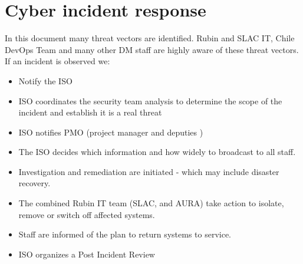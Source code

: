 \section{Cyber incident response}
In this document many threat vectors are identified.
Rubin and SLAC  IT, Chile DevOps Team and many other \gls{DM} staff are highly aware of these threat vectors.
If an incident is observed we:
\begin{itemize}
\item Notify the \gls{ISO} 
\item \gls{ISO} coordinates the security team analysis to determine the scope of the incident and establish it is a real threat
\item \gls{ISO} notifies \gls{PMO} (project manager and deputies )
\item The \gls{ISO} decides which information and  how widely to broadcast to all staff.
\item Investigation and remediation are initiated - which may include disaster recovery.
\item The combined Rubin \gls{IT} team (SLAC, and AURA)  take action to isolate, remove or  switch off affected systems.
\item Staff are informed of the plan to return systems to service.
\item \gls{ISO} organizes a Post Incident Review
\end{itemize}

